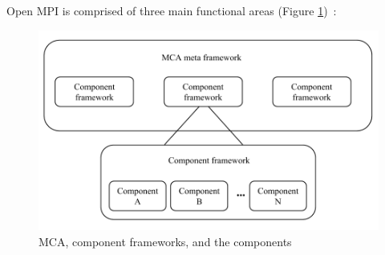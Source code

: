 Open MPI is comprised of three main functional areas (Figure \ref{fig:MCA_framework})~\cite{graham2006open}:

\begin{figure}[ht]
\centering
\includegraphics[scale=0.4]{images/MCA_framework.png}
\caption[MCA, component frameworks, and the components]{MCA, component frameworks, and the components}
\label{fig:MCA_framework}
\end{figure}

